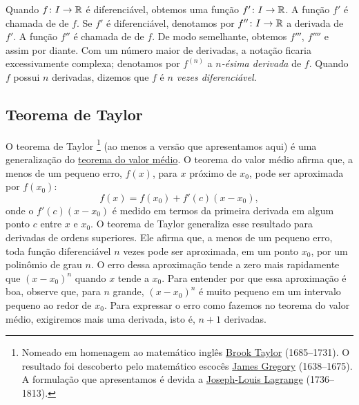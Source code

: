 Quando $f \colon I \to {\mathbb{R}}$ é diferenciável, obtemos uma função
$f' \colon I \to {\mathbb{R}}$. A função $f'$ é chamada de
\emph{} de $f$.
Se $f'$ é diferenciável, denotamos por $f'' \colon I \to {\mathbb{R}}$ a derivada de $f'$. A função $f''$ é chamada de
\emph{} de $f$.
De modo semelhante, obtemos $f'''$, $f''''$ e assim por diante.
Com um número maior de derivadas, a notação ficaria excessivamente complexa; denotamos por $f^{(n)}$ a
\emph{$n$-ésima derivada} de $f$.
%
Quando $f$ possui $n$ derivadas, dizemos que $f$ é
\emph{$n$ vezes diferenciável}.

\subsection{Teorema de Taylor}

O teorema de Taylor%
\footnote{Nomeado em homenagem ao matemático inglês
\href{https://en.wikipedia.org/wiki/Brook_Taylor}{Brook Taylor}
(1685--1731). O resultado foi descoberto pelo matemático escocês
\href{https://en.wikipedia.org/wiki/James_Gregory_(mathematician)}{James Gregory}
(1638--1675). A formulação que apresentamos é devida a
\href{https://en.wikipedia.org/wiki/Lagrange}{Joseph-Louis Lagrange}
(1736--1813).} (ao menos a versão que apresentamos aqui)
é uma generalização do \hyperref[thm:mvt]{teorema do valor médio}.
O teorema do valor médio afirma que, a menos de um pequeno erro, $f(x)$, para $x$ próximo de $x_0$, pode ser aproximada por $f(x_0)$:
\begin{equation*}
f(x) = f(x_0) + f'(c)(x-x_0),
\end{equation*}
onde o  $f'(c)(x-x_0)$ é medido em termos da primeira derivada em algum ponto $c$ entre $x$ e $x_0$.
O teorema de Taylor generaliza esse resultado para derivadas de ordens superiores. Ele afirma que, a menos de um pequeno erro, toda função diferenciável $n$ vezes pode ser aproximada, em um ponto $x_0$, por um polinômio de grau $n$. O erro dessa aproximação tende a zero mais rapidamente que ${(x-x_0)}^n$ quando $x$ tende a $x_0$.
Para entender por que essa aproximação é boa, observe que, para $n$ grande, ${(x-x_0)}^n$ é muito pequeno em um intervalo pequeno ao redor de $x_0$.
Para expressar o erro como fazemos no teorema do valor médio, exigiremos mais uma derivada, isto é, $n+1$ derivadas.

